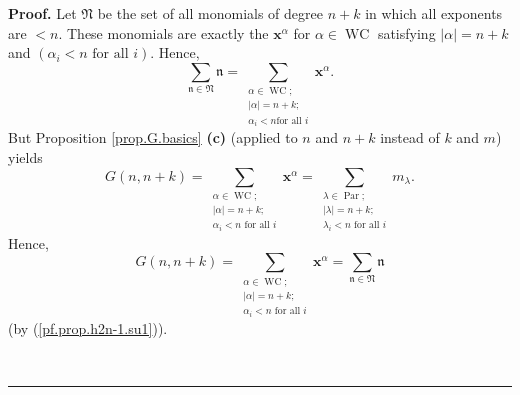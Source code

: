 \documentclass[numbers=enddot,12pt,final,onecolumn,notitlepage]{scrartcl}%
\theoremstyle{definition}
\newenvironment{proof}[1][Proof]{\noindent\textbf{#1.} }{\ \rule{0.5em}{0.5em}}
\let\sumnonlimits\sum
\renewcommand{\sum}{\sumnonlimits\limits}
\begin{document}
\begin{proof}
Let $\mathfrak{N}$ be the set of all monomials of degree $n+k$ in which all
exponents are $<n$. These monomials are exactly the $\mathbf{x}^{\alpha}$ for
$\alpha\in\operatorname*{WC}$ satisfying $\left\vert \alpha\right\vert =n+k$
and $\left(  \alpha_{i}<n\text{ for all }i\right)  $. Hence,%
\begin{equation}
\sum_{\mathfrak{n}\in\mathfrak{N}}\mathfrak{n}=\sum_{\substack{\alpha
\in\operatorname*{WC};\\\left\vert \alpha\right\vert =n+k;\\\alpha_{i}<n\text{
for all }i}}\mathbf{x}^{\alpha}. \label{pf.prop.h2n-1.su1}%
\end{equation}
But Proposition \ref{prop.G.basics} \textbf{(c)} (applied to $n$ and $n+k$
instead of $k$ and $m$) yields
\[
G\left(  n,n+k\right)  =\sum_{\substack{\alpha\in\operatorname*{WC}%
;\\\left\vert \alpha\right\vert =n+k;\\\alpha_{i}<n\text{ for all }%
i}}\mathbf{x}^{\alpha}=\sum_{\substack{\lambda\in\operatorname*{Par}%
;\\\left\vert \lambda\right\vert =n+k;\\\lambda_{i}<n\text{ for all }%
i}}m_{\lambda}.
\]
Hence,%
\begin{equation}
G\left(  n,n+k\right)  =\sum_{\substack{\alpha\in\operatorname*{WC}%
;\\\left\vert \alpha\right\vert =n+k;\\\alpha_{i}<n\text{ for all }%
i}}\mathbf{x}^{\alpha}=\sum_{\mathfrak{n}\in\mathfrak{N}}\mathfrak{n}
\label{pf.prop.h2n-1.su1pet}%
\end{equation}
(by (\ref{pf.prop.h2n-1.su1})).


\end{proof}
\end{document}
